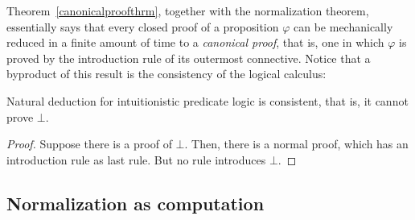 Theorem~\ref{canonicalproofthrm}, together with the normalization theorem,
essentially says that every closed proof of a proposition $\varphi$ can be
mechanically reduced in a finite amount of time to a \emph{canonical proof},
that is, one in which $\varphi$ is proved by the introduction rule of its
outermost connective. Notice that a byproduct of this result is the consistency
of the logical calculus:

\begin{theorem}
  Natural deduction for intuitionistic predicate logic is consistent, that is,
  it cannot prove $\bot$.
\end{theorem}
\begin{proof}
  Suppose there is a proof of $\bot$. Then, there is a normal proof, which has
  an introduction rule as last rule. But no rule introduces $\bot$.
\end{proof}

\subsection{Normalization as computation}

